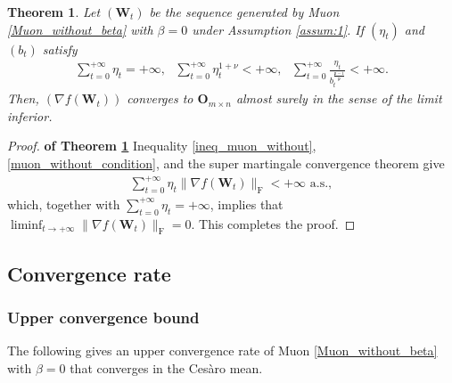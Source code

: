\documentclass[twoside,11pt]{article}
\newtheorem{thm}{Theorem}[section]
\begin{document}
\begin{thm}\label{thm:muon_without_convergence}
Let $(\bm{W}_t)$ be the sequence generated by Muon \eqref{Muon_without_beta} with $\beta = 0$ under Assumption \ref{assum:1}. If $(\eta_t)$ and $(b_t)$ satisfy 
\begin{align}\label{muon_without_condition}
\sum_{t=0}^{+\infty} \eta_t = + \infty, \text{ }
\sum_{t=0}^{+\infty} \eta_t^{1 + \nu} < + \infty, \text{ } 
\sum_{t=0}^{+\infty} \frac{\eta_t}{b_t^{\frac{\mathfrak{p} - 1}{\mathfrak{p}}}} < + \infty.
\end{align}
Then, $(\nabla f (\bm{W}_t))$ converges to $\bm{O}_{m \times n}$ almost surely in the sense of the limit inferior. 
\end{thm}

\begin{proof}
\textbf{of Theorem \ref{thm:muon_without_convergence}} Inequality \eqref{ineq_muon_without}, \eqref{muon_without_condition}, and the super martingale convergence theorem \citep[Proposition 8.2.10]{bert}  give
\begin{align*}
\sum_{t=0}^{+ \infty} \eta_t \| \nabla f (\bm{W}_t)\|_{\mathrm{F}} < + \infty \text{ a.s.},
\end{align*}
which, together with $\sum_{t=0}^{+ \infty} \eta_t = + \infty$, implies that $\liminf_{t \to + \infty} \| \nabla f (\bm{W}_t)\|_{\mathrm{F}} = 0$. This completes the proof.
\end{proof}

\subsection{Convergence rate}
\subsubsection{Upper convergence bound}
The following gives an upper convergence rate of Muon \eqref{Muon_without_beta} with $\beta = 0$ that converges in the Ces\`{a}ro mean.
\end{document}
